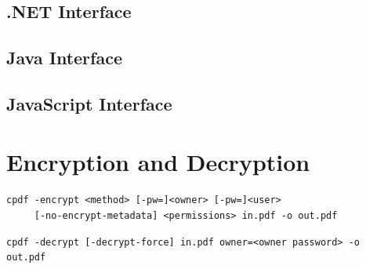 \documentclass{book}
\begin{document}
\begin{dotnetcpdflib}
\clearpage
\section*{.NET Interface}
\begin{small}\tt

\end{small}
\end{dotnetcpdflib}

\begin{jcpdflib}
\clearpage
\section*{Java Interface}
\begin{small}\tt

\end{small}
\end{jcpdflib}

\begin{jscpdflib}
\clearpage
\section*{JavaScript Interface}
\begin{small}\tt

\end{small}
\end{jscpdflib}

\chapter{Encryption and Decryption}\label{chap:4}
\pagestyle{fancy}
\label{encryption}
  \begin{framed}
    \small\noindent\verb!cpdf -encrypt <method> [-pw=]<owner> [-pw=]<user>!\\
    \noindent\verb!     [-no-encrypt-metadata] <permissions> in.pdf -o out.pdf!

    \vspace{1.5mm}
    \noindent\verb!cpdf -decrypt [-decrypt-force] in.pdf owner=<owner password> -o out.pdf!
  \end{framed}
  \label{crypt}
\end{document}
